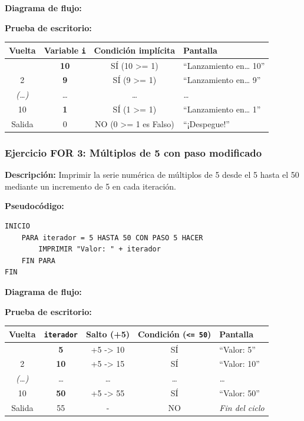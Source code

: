 \textbf{Diagrama de flujo:}



\textbf{Prueba de escritorio:}

{\def\LTcaptype{none} %
\begin{longtable}[]{@{}cccl@{}}
\toprule\noalign{}
Vuelta & Variable \texttt{i} & Condición implícita & Pantalla \\
\midrule\noalign{}
\endhead
\bottomrule\noalign{}
\endlastfoot
1 & \textbf{10} & SÍ (10 \textgreater= 1) & ``Lanzamiento en\ldots{}
10'' \\
2 & \textbf{9} & SÍ (9 \textgreater= 1) & ``Lanzamiento en\ldots{}
9'' \\
\emph{(\ldots)} & \emph{\ldots{}} & \emph{\ldots{}} & \emph{\ldots{}} \\
10 & \textbf{1} & SÍ (1 \textgreater= 1) & ``Lanzamiento en\ldots{}
1'' \\
Salida & 0 & NO (0 \textgreater= 1 es Falso) & ``¡Despegue!'' \\
\end{longtable}
}

\subsubsection{Ejercicio FOR 3: Múltiplos de 5 con paso
modificado}\label{ejercicio-for-3-muxfaltiplos-de-5-con-paso-modificado}

\textbf{Descripción:} Imprimir la serie numérica de múltiplos de 5 desde
el 5 hasta el 50 mediante un incremento de 5 en cada iteración.

\textbf{Pseudocódigo:}

\begin{verbatim}
INICIO
    PARA iterador = 5 HASTA 50 CON PASO 5 HACER
        IMPRIMIR "Valor: " + iterador
    FIN PARA
FIN
\end{verbatim}

\textbf{Diagrama de flujo:}



\textbf{Prueba de escritorio:}

{\def\LTcaptype{none} %
\begin{longtable}[]{@{}ccccl@{}}
\toprule\noalign{}
Vuelta & \texttt{iterador} & Salto (+5) & Condición
(\texttt{\textless{}=\ 50}) & Pantalla \\
\midrule\noalign{}
\endhead
\bottomrule\noalign{}
\endlastfoot
1 & \textbf{5} & +5 -\textgreater{} 10 & SÍ & ``Valor: 5'' \\
2 & \textbf{10} & +5 -\textgreater{} 15 & SÍ & ``Valor: 10'' \\
\emph{(\ldots)} & \emph{\ldots{}} & \emph{\ldots{}} & \emph{\ldots{}} &
\emph{\ldots{}} \\
10 & \textbf{50} & +5 -\textgreater{} 55 & SÍ & ``Valor: 50'' \\
Salida & 55 & - & NO & \emph{Fin del ciclo} \\
\end{longtable}
}

